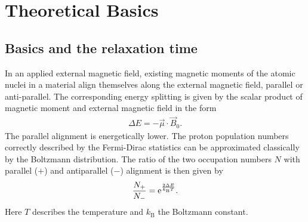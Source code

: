 \section{Theoretical Basics}



\subsection{Basics and the relaxation time}
In an applied external magnetic field, existing magnetic moments of the atomic nuclei in a material align themselves along the external magnetic field, parallel or anti-parallel.
The corresponding energy splitting is given by the scalar product of magnetic moment and external magnetic field in the form
\begin{align}
\Delta E=-\vec{\mu}\cdot\vec{B}_0.
\end{align}
The parallel alignment is energetically lower.
The proton population numbers correctly described by the Fermi-Dirac statistics can be approximated classically by the Boltzmann distribution.
The ratio of the two occupation numbers $N$ with parallel ($+$) and antiparallel ($-$) alignment is then given by
\begin{align}
\frac{N_+}{N_-}=\mathrm{e}^{\frac{2\Delta E}{k_\text{B}T}}.
\end{align}
Here $T$ describes the temperature and $k_\text{B}$ the Boltzmann constant.\\

